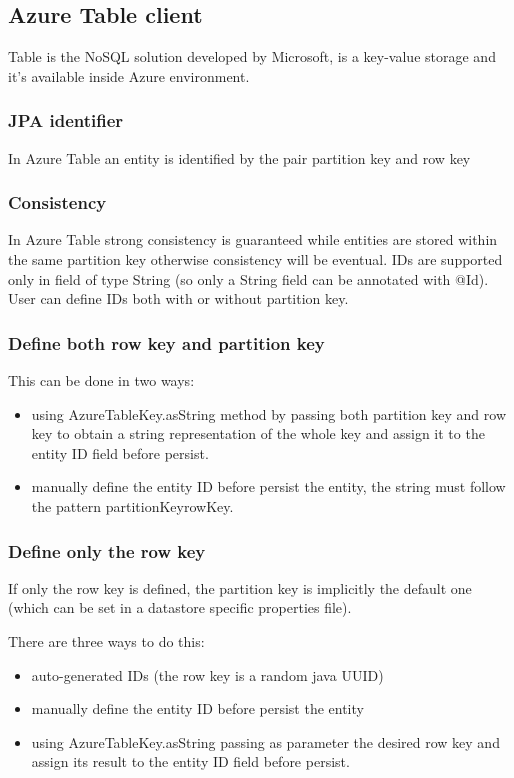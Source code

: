 \subsection{Azure Table client}
\label{sec:kundera-table}
Table is the NoSQL solution developed by Microsoft, is a key-value storage and it's available inside Azure environment.

\subsubsection{JPA identifier}
In Azure Table an entity is identified by the pair partition key and row key 

\subsubsection{Consistency}
In Azure Table strong consistency is guaranteed while entities are stored within the same partition key otherwise consistency will be eventual. IDs are supported only in field of type String (so only a String field can be annotated with @Id). User can define IDs both with or without partition key.

\subsubsection{Define both row key and partition key}
This can be done in two ways:
\begin{itemize}
\item using AzureTableKey.asString method by passing both partition key and row key to obtain a string representation of the whole key and assign it to the entity ID field before persist.
\item manually define the entity ID before persist the entity, the string must follow the pattern partitionKey\textunderscore rowKey.
\end{itemize}

\subsubsection{Define only the row key}
If only the row key is defined, the partition key is implicitly the default one (which can be set in a datastore specific properties file).

There are three ways to do this:
\begin{itemize}
\item auto-generated IDs (the row key is a random java UUID)
\item manually define the entity ID before persist the entity
\item using AzureTableKey.asString passing as parameter the desired row key and assign its result to the entity ID field before persist.
\end{itemize}

